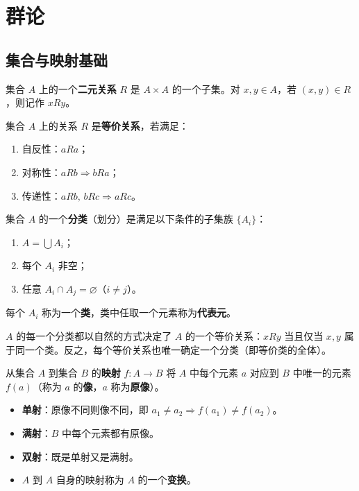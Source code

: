 \chapter{群论}

\section{集合与映射基础}

\begin{definition}[二元关系]
集合 $A$ 上的一个\textbf{二元关系} $R$ 是 $A \times A$ 的一个子集。对 $x, y \in A$，若 $(x,y) \in R$，则记作 $xRy$。
\end{definition}

\begin{definition}[等价关系]
集合 $A$ 上的关系 $R$ 是\textbf{等价关系}，若满足：
\begin{enumerate}
  \item 自反性：$aRa$；
  \item 对称性：$aRb \Rightarrow bRa$；
  \item 传递性：$aRb,\, bRc \Rightarrow aRc$。
\end{enumerate}
\end{definition}

\begin{definition}[分类（划分）]
集合 $A$ 的一个\textbf{分类}（划分）是满足以下条件的子集族 $\{A_i\}$：
\begin{enumerate}
  \item $A = \bigcup A_i$；
  \item 每个 $A_i$ 非空；
  \item 任意 $A_i \cap A_j = \varnothing$（$i \ne j$）。
\end{enumerate}
每个 $A_i$ 称为一个\textbf{类}，类中任取一个元素称为\textbf{代表元}。
\end{definition}

\begin{note}
$A$ 的每一个分类都以自然的方式决定了 $A$ 的一个等价关系：$xRy$ 当且仅当 $x, y$ 属于同一个类。反之，每个等价关系也唯一确定一个分类（即等价类的全体）。
\end{note}

\begin{definition}[映射]
从集合 $A$ 到集合 $B$ 的\textbf{映射} $f\colon A \to B$ 将 $A$ 中每个元素 $a$ 对应到 $B$ 中唯一的元素 $f(a)$（称为 $a$ 的\textbf{像}，$a$ 称为\textbf{原像}）。
\begin{itemize}
  \item \textbf{单射}：原像不同则像不同，即 $a_1 \ne a_2 \Rightarrow f(a_1) \ne f(a_2)$。
  \item \textbf{满射}：$B$ 中每个元素都有原像。
  \item \textbf{双射}：既是单射又是满射。
  \item $A$ 到 $A$ 自身的映射称为 $A$ 的一个\textbf{变换}。
\end{itemize}
\end{definition}

